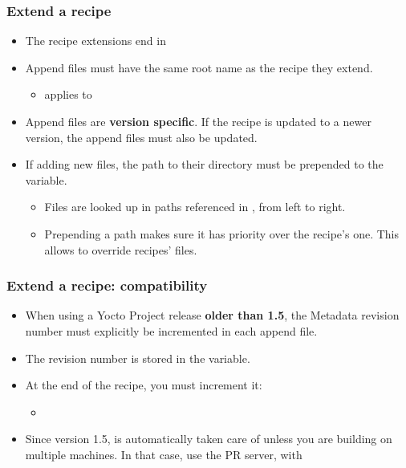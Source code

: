 \begin{frame}
  \frametitle{Extend a recipe}
  \begin{itemize}
    \item The recipe extensions end in 
    \item Append files must have the same root name as the recipe they
          extend.
    \begin{itemize}
      \item {} applies to
    \end{itemize}
    \item Append files are {\bf version specific}. If the recipe is
          updated to a newer version, the append files must also be
          updated.
    \item If adding new files, the path to their directory must
          be prepended to the  variable.
    \begin{itemize}
      \item Files are looked up in paths referenced in
            , from left to right.
      \item Prepending a path makes sure it has priority over the recipe's
            one. This allows to override recipes' files.
    \end{itemize}
  \end{itemize}
\end{frame}

\begin{frame}
  \frametitle{Extend a recipe: compatibility}
  \begin{itemize}
    \item When using a Yocto Project release {\bf older than 1.5}, the
      Metadata revision number must explicitly be incremented in each
      append file.
    \item The revision number is stored in the  variable.
    \item At the end of the recipe, you must increment it:
      \begin{itemize}
        \item {}
      \end{itemize}
    \item Since version 1.5,  is automatically taken care
      of unless you are building on multiple machines. In that case,
      use the PR server, with 
  \end{itemize}
\end{frame}

